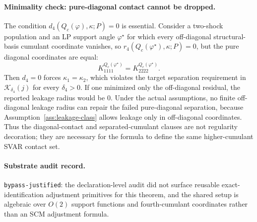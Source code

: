 \paragraph{Minimality check: pure-diagonal contact cannot be dropped.}
The condition \(d_4(Q_c(\varphi),\kappa;P)=0\) is essential.  Consider a two-shock population and an LP support angle \(\varphi^\star\) for which every off-diagonal structural-basis cumulant coordinate vanishes, so \(r_4(Q_c(\varphi^\star),\kappa;P)=0\), but the pure diagonal coordinates are equal:
\[
K^{Q_c(\varphi^\star)}_{1111}
=K^{Q_c(\varphi^\star)}_{2222}.
\]
Then \(d_4=0\) forces \(\kappa_1=\kappa_2\), which violates the target separation requirement in \(\mathcal K_{\delta_4}(j)\) for every \(\delta_4>0\).  If one minimized only the off-diagonal residual, the reported leakage radius would be \(0\).  Under the actual assumptions, no finite off-diagonal leakage radius can repair the failed pure-diagonal separation, because Assumption~\ref{ass:leakage-class} allows leakage only in off-diagonal coordinates.  Thus the diagonal-contact and separated-cumulant clauses are not regularity decoration; they are necessary for the formula to define the same higher-cumulant SVAR contact set.

\paragraph{Substrate audit record.}
\texttt{bypass-justified}: the declaration-level audit did not surface reusable exact-identification adjustment primitives for this theorem, and the shared setup is algebraic over \(O(2)\) support functions and fourth-cumulant coordinates rather than an SCM adjustment formula.
